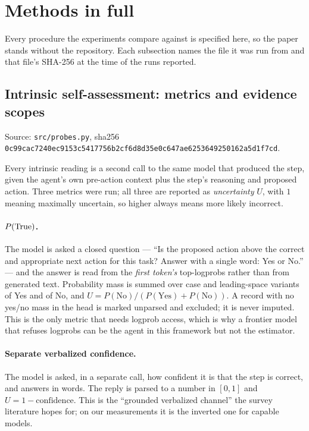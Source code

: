 \section{Methods in full}\label{app:methods}

Every procedure the experiments compare against is specified here, so the paper
stands without the repository. Each subsection names the file it was run from and
that file's SHA-256 at the time of the runs reported.

\subsection{Intrinsic self-assessment: metrics and evidence scopes}
\label{app:methods:intrinsic}

Source: \texttt{src/probes.py}, sha256
\texttt{0c99cac7240ec9153c5417756b2cf6d8d35e0c647ae6253649250162a5d1f7cd}.

Every intrinsic reading is a second call to the same model that produced the step,
given the agent's own pre-action context plus the step's reasoning and proposed
action. Three metrics were run; all three are reported as \emph{uncertainty} $U$,
with $1$ meaning maximally uncertain, so higher always means more likely
incorrect.

\paragraph{$P(\text{True})$.} The model is asked a closed question --- ``Is the proposed
action above the correct and appropriate next action for this task? Answer with a
single word: Yes or No.'' --- and the answer is read from the \emph{first token's}
top-logprobs rather than from generated text. Probability mass is summed over
case and leading-space variants of Yes and of No, and $U = P(\mathrm{No}) /
(P(\mathrm{Yes}) + P(\mathrm{No}))$. A record with no yes/no mass in the head is
marked unparsed and excluded; it is never imputed. This is the only metric that
needs logprob access, which is why a frontier model that refuses logprobs can be
the agent in this framework but not the estimator.

\paragraph{Separate verbalized confidence.} The model is asked, in a separate
call, how confident it is that the step is correct, and answers in words. The
reply is parsed to a number in $[0,1]$ and $U = 1 - \mathrm{confidence}$. This is
the ``grounded verbalized channel'' the survey literature hopes for; on our
measurements it is the inverted one for capable models.

